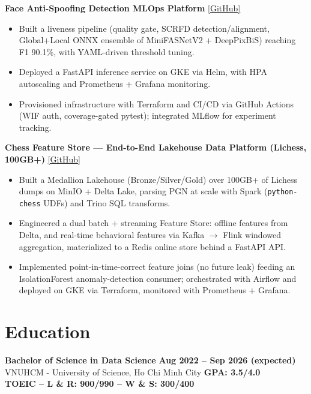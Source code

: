 \documentclass[a4paper,10pt]{article}
\begin{document}
\vspace{0.2em}
\noindent\textbf{Face Anti-Spoofing Detection MLOps Platform} \hfill \href{https://github.com/theAbyssOfTime2004/face-spoofing-detection}{\color{darkblue}[GitHub]} \\\vspace{-1.1em}

\begin{itemize}[leftmargin=1.2em, itemsep=0.05em, parsep=0pt]
    \item Built a liveness pipeline (quality gate, SCRFD detection/alignment, Global+Local ONNX ensemble of MiniFASNetV2 + DeepPixBiS) reaching F1 90.1\%, with YAML-driven threshold tuning.
    \item Deployed a FastAPI inference service on GKE via Helm, with HPA autoscaling and Prometheus + Grafana monitoring.
    \item Provisioned infrastructure with Terraform and CI/CD via GitHub Actions (WIF auth, coverage-gated pytest); integrated MLflow for experiment tracking.
\end{itemize}

\vspace{0.2em}
\noindent\textbf{Chess Feature Store --- End-to-End Lakehouse Data Platform (Lichess, 100GB+)} \hfill \href{https://github.com/theAbyssOfTime2004/lichess-feature-store}{\color{darkblue}[GitHub]} \\\vspace{-1.1em}

\begin{itemize}[leftmargin=1.2em, itemsep=0.05em, parsep=0pt]
    \item Built a Medallion Lakehouse (Bronze/Silver/Gold) over 100GB+ of Lichess dumps on MinIO + Delta Lake, parsing PGN at scale with Spark (\texttt{python-chess} UDFs) and Trino SQL transforms.
    \item Engineered a dual batch + streaming Feature Store: offline features from Delta, and real-time behavioral features via Kafka $\rightarrow$ Flink windowed aggregation, materialized to a Redis online store behind a FastAPI API.
    \item Implemented point-in-time-correct feature joins (no future leak) feeding an IsolationForest anomaly-detection consumer; orchestrated with Airflow and deployed on GKE via Terraform, monitored with Prometheus + Grafana.
\end{itemize}

\section{Education}
\textbf{Bachelor of Science in Data Science} \hfill \textbf{Aug 2022 -- Sep 2026 (expected)} \\
VNUHCM - University of Science, Ho Chi Minh City \hfill \textbf{GPA: 3.5/4.0} \\
\textbf{TOEIC – L \& R: 900/990 – W \& S: 300/400}
\end{document}
